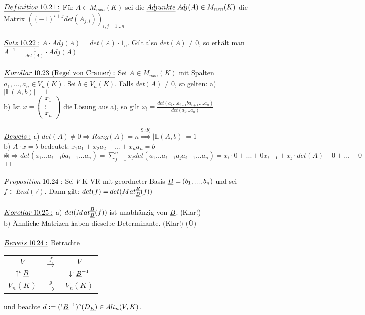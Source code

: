 \documentclass[fleqn, a4paper, 11pt]{scrartcl}
\theoremstyle{definition}
\begin{document}
\\
$\uline{Definition\:10.21:}$ Für $A\in M_{nxn}(K)$ sei die $\uline{Adjunkte}\:Adj(A)\in M_{nxn}(K)$ die Matrix $((-1)^{i+j}det(A_{j,i}))_{i,j=1...n}$\\
\\
$\uline{Satz\:10.22:}$ $A\cdot Adj(A)=det(A)\cdot 1_n$. Gilt also $det(A)\neq 0$, so erhält man $A^{-1}=\tfrac{1}{det(A)}\cdot Adj(A)$\\
\\
$\uline{Korollar\:10.23\text{ (Regel von Cramer)}:}$ Sei $A\in M_{nxn}(K)$ mit Spalten $a_1,...,a_n\in V_n(K)$. Sei $b\in V_n(K)$. Falls $det(A)\neq 0$, so gelten: a) $|\mathbb{L}(A,b)|=1$\\
b) Ist $x=\begin{pmatrix}
	x_1\\
	\vdots\\
	x_n
\end{pmatrix}$ die Lösung aus a), so gilt $x_i=\tfrac{det(a_1...a_{i-1}b a_{i+1}....a_n)}{det(a_1...a_n)}$\\
\\
$\uline{Beweis:}$ a) $det(A)\neq 0\Rightarrow Rang(A)=n\stackrel{9.4b)}{\Rightarrow}|\mathbb{L}(A,b)|=1$\\
b) $A\cdot x=b$ bedeutet: $x_1 a_1+x_2 a_2+...+x_n a_n=b$ $\circledast\Rightarrow det(a_1...a_{i-1} b a_{i+1} ... a_n)=\sum\limits_{j=1}^n x_j det(a_1...a_{i-1} a_j a_{i+1} ... a_n)=x_i\cdot 0+...+0 x_{i-1}+ x_j\cdot det(A)+0+...+0$ \hfill $\Box$\\
\\
$\uline{Proposition\:10.24:}$ Sei $V$ K-VR mit geordneter Basis $\uline{B}=(b_1,...,b_n)$ und sei $f\in End(V)$. Dann gilt: $det(f)=det(Mat_{\uline{B}}^{\uline{B}}(f))$\\
\\
$\uline{Korollar\:10.25:}$ a) $det(Mat_{\uline{B}}^{\uline{B}}(f))$ ist unabhängig von $\uline{B}$. (Klar!)\\
b) Ähnliche Matrizen haben dieselbe Determinante. (Klar!) (\"U)\\
\\
$\uline{Beweis\:10.24:}$ Betrachte \begin{tabular}{ccc}
	$V$ & $\stackrel{f}{\rightarrow}$ & $V$ \\
	$\uparrow ^{\iota}\uline{B}$ & & $\downarrow ^{\iota}\uline{B}^{-1}$\\
	$V_n(K)$ & $\stackrel{g}{\rightarrow}$ & $V_n(K)$
\end{tabular} und beachte $d:=(^{\iota}\uline{B}^{-1})^{\circ}(D_{\uline{E}})\in Alt_n(V,K)$.\\
\end{document}
